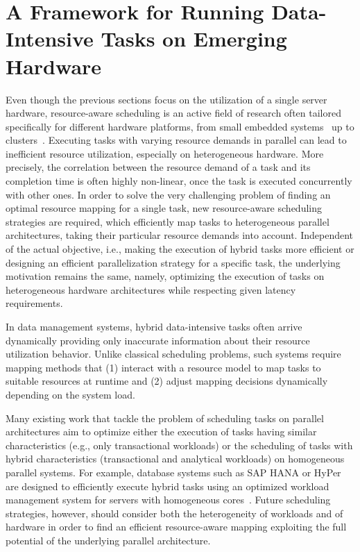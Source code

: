 \documentclass[11pt,dvipdfm]{article}
\begin{document}
\section{A Framework for Running Data-Intensive Tasks on Emerging Hardware}
\label{sec:guide}

Even though the previous sections focus on the utilization of a single server hardware,
resource-aware scheduling is an active field of research often tailored specifically for different hardware platforms,
from small embedded systems~\cite{Tillenius_2015} up to clusters~\cite{Delimitrou_2014}.
Executing tasks with varying resource demands in parallel can lead to inefficient resource utilization,
especially on heterogeneous hardware.
More precisely, the correlation between the resource demand of a task and its completion time is often highly non-linear,
once the task is executed concurrently with other ones.
In order to solve the very challenging problem of finding an optimal resource mapping for a single task,
new resource-aware scheduling strategies are required,
which efficiently map tasks to heterogeneous parallel architectures,
taking their particular resource demands into account. 
Independent of the actual objective,
i.e., making the execution of hybrid tasks more efficient or
designing an efficient parallelization strategy for a specific task,
the underlying motivation remains the same, namely,
optimizing the execution of tasks on heterogeneous hardware architectures while respecting given latency requirements.

In data management systems,
hybrid data-intensive tasks often arrive dynamically
providing only inaccurate information about their resource utilization behavior.
Unlike classical scheduling problems, such systems require mapping methods that
(1) interact with a resource model to map tasks to suitable resources at runtime and
(2) adjust mapping decisions dynamically depending on the system load. 

Many existing work that tackle the problem of scheduling tasks on parallel architectures
aim to optimize either the execution of tasks having similar characteristics (e.g., only transactional workloads) or
the scheduling of tasks with hybrid characteristics (transactional and analytical workloads) on homogeneous parallel systems.
For example, database systems such as SAP HANA or HyPer are designed to efficiently execute hybrid tasks
using an optimized workload management system for servers with homogeneous cores~\cite{Psaroudakis_2015}.
Future scheduling strategies, however, should consider both the heterogeneity of workloads and of hardware
in order to find an efficient resource-aware mapping exploiting the full potential of the underlying parallel architecture.
\end{document}
